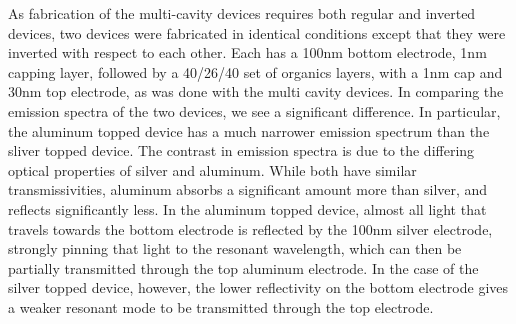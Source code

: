 \documentclass{report}
\begin{document}
            As fabrication of the multi-cavity devices requires both regular and inverted devices, two devices were fabricated in identical conditions except that they were inverted with respect to each other. Each has a 100nm bottom electrode, 1nm capping layer, followed by a 40/26/40 set of organics layers, with a 1nm cap and 30nm top electrode, as was done with the multi cavity devices. In comparing the emission spectra of the two devices, we see a significant difference. In particular, the aluminum topped device has a much narrower emission spectrum than the sliver topped device. The contrast in emission spectra is due to the differing optical properties of silver and aluminum. While both have similar transmissivities, aluminum absorbs a significant amount more than silver, and reflects significantly less.\cite{Stavrinou1999} In the aluminum topped device, almost all light that travels towards the bottom electrode is reflected by the 100nm silver electrode, strongly pinning that light to the resonant wavelength, which can then be partially transmitted through the top aluminum electrode. In the case of the silver topped device, however, the lower reflectivity on the bottom electrode gives a weaker resonant mode to be transmitted through the top electrode.
\end{document}
